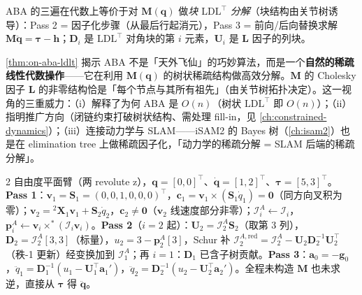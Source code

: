 \begin{theorem}\label{thm:on-aba-ldlt}
ABA 的三遍在代数上等价于对 $\mathbf M(\mathbf q)$ 做\emph{块 $\mathrm{LDL}^\top$ 分解}（块结构由关节树诱导）：Pass 2 = 因子化步骤（从最后行起消元），Pass 3 = 前向/后向替换求解 $\mathbf M\ddot{\mathbf q}=\boldsymbol\tau-\mathbf h$；$\mathbf D_i$ 是 $\mathrm{LDL}^\top$ 对角块的第 $i$ 元素，$\mathbf U_i$ 是 $\mathbf L$ 因子的列块\cite{featherstone2008rigid,jain2011robot}。
\end{theorem}

\begin{insight}
\cref{thm:on-aba-ldlt} 揭示 ABA 不是「天外飞仙」的巧妙算法，而是一个\textbf{自然的稀疏线性代数操作}——它在利用 $\mathbf M(\mathbf q)$ 的树状稀疏结构做高效分解。$\mathbf M$ 的 Cholesky 因子 $\mathbf L$ 的非零结构恰是「每个节点与其所有祖先」（由关节树拓扑决定）。这一视角的三重威力：（i）解释了为何 ABA 是 $O(n)$（树状 $\mathrm{LDL}^\top$ 即 $O(n)$）；（ii）指明推广方向（闭链约束打破树状结构、需处理 fill-in，见 \cref{ch:constrained-dynamics}）；（iii）连接动力学与 SLAM——iSAM2 的 Bayes 树（\cref{ch:isam2}）也是在 elimination tree 上做稀疏因子化，「动力学的稀疏分解 = SLAM 后端的稀疏分解」。
\end{insight}

\begin{example}\label{ex:on-aba-2link}
2 自由度平面臂（两 revolute z），$\mathbf q=[0,0]^\top$、$\dot{\mathbf q}=[1,2]^\top$、$\boldsymbol\tau=[5,3]^\top$。\textbf{Pass 1}：$\mathbf v_1=\mathbf S_1=(0,0,1,0,0,0)^\top$，$\mathbf c_1=\mathbf v_1\times(\mathbf S_1\dot q_1)=\mathbf 0$（同方向叉积为零）；$\mathbf v_2={}^2\mathbf X_1\mathbf v_1+\mathbf S_2\dot q_2$，$\mathbf c_2\neq\mathbf 0$（$\mathbf v_2$ 线速度部分非零）；$\mathcal I_i^A\!\leftarrow\!\mathcal I_i$，$\mathbf p_i^A\!\leftarrow\!\mathbf v_i\times^*(\mathcal I_i\mathbf v_i)$。\textbf{Pass 2}（$i=2$ 起）：$\mathbf U_2=\mathcal I_2^A\mathbf S_2$（取第 3 列），$\mathbf D_2=\mathcal I_2^A[3,3]$（标量），$u_2=3-\mathbf p_2^A[3]$，Schur 补 $\mathcal I_2^{A,\mathrm{red}}=\mathcal I_2^A-\mathbf U_2\mathbf D_2^{-1}\mathbf U_2^\top$（秩-1 更新）经变换加到 $\mathcal I_1^A$；再 $i=1$：$\mathbf D_1$ 已含子树贡献。\textbf{Pass 3}：$\mathbf a_0=-\mathbf g_0$，$\ddot q_1=\mathbf D_1^{-1}(u_1-\mathbf U_1^\top\mathbf a_1')$，$\ddot q_2=\mathbf D_2^{-1}(u_2-\mathbf U_2^\top\mathbf a_2')$。全程未构造 $\mathbf M$ 也未求逆，直接从 $\boldsymbol\tau$ 得 $\ddot{\mathbf q}$。
\end{example}

